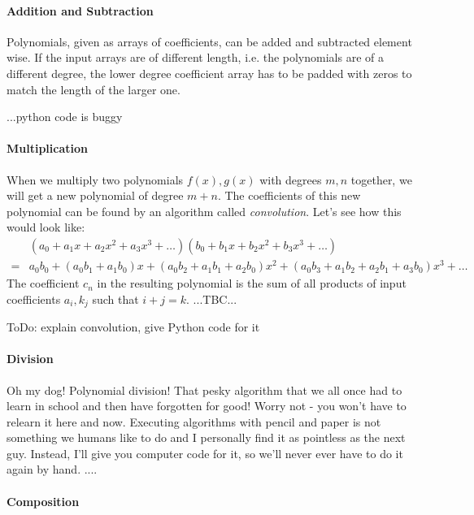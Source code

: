 \paragraph{Addition and Subtraction}
Polynomials, given as arrays of coefficients, can be added and subtracted element wise. If the input arrays are of different length, i.e. the polynomials are of a different degree, the lower degree coefficient array has to be padded with zeros to match the length of the larger one.

...python code is buggy

\paragraph{Multiplication}
When we multiply two polynomials $f(x), g(x)$ with degrees $m,n$ together, we will get a new polynomial of degree $m+n$. The coefficients of this new polynomial can be found by an algorithm called \emph{convolution}. Let's see how this would look like:
\begin{eqnarray}
&(a_0 + a_1 x + a_2 x^2 + a_3 x^3 + \ldots)
 (b_0 + b_1 x + b_2 x^2 + b_3 x^3 + \ldots)  \\
=&   a_0 b_0 
+ (a_0 b_1 + a_1 b_0) x 
+ (a_0 b_2 + a_1 b_1 + a_2 b_0) x^2 
+ (a_0 b_3 + a_1 b_2 + a_2 b_1 + a_3 b_0) x^3 
+ \ldots
\end{eqnarray}
The coefficient $c_n$ in the resulting polynomial is the sum of all products of input coefficients $a_i, k_j$ such that $i+j = k$.
 ...TBC...


ToDo: explain convolution, give Python code for it

\paragraph{Division}
Oh my dog! Polynomial division! That pesky algorithm that we all once had to learn in school and then have forgotten for good! Worry not - you won't have to relearn it here and now. Executing algorithms with pencil and paper is not something we humans like to do and I personally find it as pointless as the next guy. Instead, I'll give you computer code for it, so we'll never ever have to do it again by hand. ....

\paragraph{Composition}


